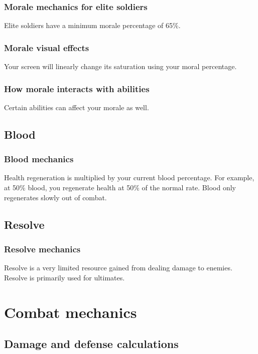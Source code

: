 \documentclass{report}
\begin{document}
        \subsubsection{Morale mechanics for elite soldiers}
        Elite soldiers have a minimum morale percentage of 65\%.
    
        \subsubsection{Morale visual effects}
        Your screen will linearly change its saturation using your moral percentage.

        \subsubsection{How morale interacts with abilities}
        Certain abilities can affect your morale as well.
        
    
        
    \subsection{Blood} 
    \subsubsection{Blood mechanics}
    Health regeneration is multiplied by your current blood percentage. For example, at 50\% blood, you regenerate health at 50\% of the normal rate. Blood only regenerates slowly out of combat.
    

    \subsection{Resolve}
    \subsubsection{Resolve mechanics}
        Resolve is a very limited resource gained from dealing damage to enemies. Resolve is primarily used for ultimates.


\section{Combat mechanics}
    \subsection{Damage and defense calculations}
\end{document}
